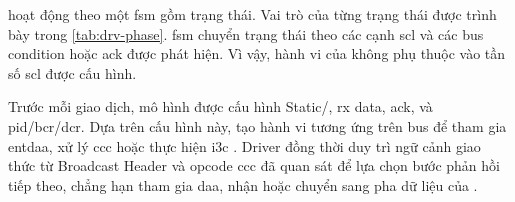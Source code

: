 \IThreeCDriver{} hoạt động theo một \gls{fsm} gồm \DriverPhaseCount{} trạng thái. Vai trò của từng
trạng thái được trình bày trong \cref{tab:drv-phase}. \gls{fsm} chuyển trạng thái theo các cạnh \gls{scl}
và các bus condition hoặc \gls{ack} được \IThreeCInterface{} phát hiện. Vì vậy,
hành vi của \IThreeCDriver{} không phụ thuộc vào tần số \gls{scl} được cấu hình.

Trước mỗi giao dịch, mô hình \Target{} được cấu hình Static/\DynamicAddress{}, \gls{rx} data, \gls{ack},
\TBit{} và \gls{pid}/\gls{bcr}/\gls{dcr}. Dựa trên cấu hình này, \IThreeCDriver{} tạo hành vi tương
ứng trên bus để tham gia \gls{entdaa}, xử lý \gls{ccc} hoặc thực hiện \gls{i3c} \PrivateTransfer{}. Driver đồng thời
duy trì ngữ cảnh giao thức từ Broadcast Header và opcode \gls{ccc} đã quan sát để lựa chọn bước phản hồi
tiếp theo, chẳng hạn tham gia \gls{daa}, nhận \EventsByte{} hoặc chuyển sang pha dữ liệu của
\PrivateTransfer{}.

